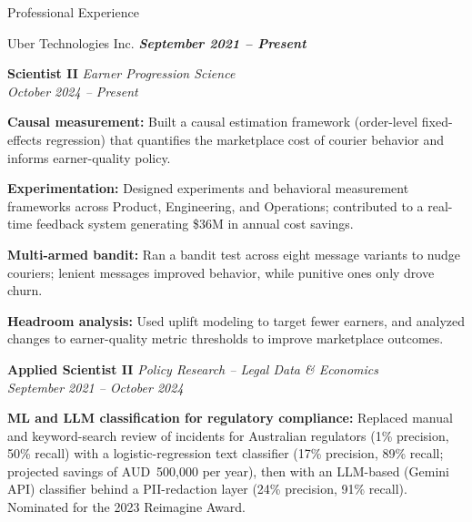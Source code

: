 \documentclass{resume} %
\begin{document}
\begin{rSection}{Professional Experience}


\begin{rSubsection}
    {Uber Technologies Inc.}
    {\textbf{\emph{September 2021 -- Present}}}
    {}
    {}

    \item[] \textbf{Scientist II}
    \hfill
    \textit{Earner Progression Science}
    \\
    \textit{October 2024 -- Present}

    \item \textbf{Causal measurement:} Built a causal estimation framework
    (order-level fixed-effects regression) that quantifies the marketplace
    cost of courier behavior and informs earner-quality policy.

    \item \textbf{Experimentation:} Designed experiments and behavioral
    measurement frameworks across Product, Engineering, and Operations;
    contributed to a real-time feedback system generating \$36M in annual
    cost savings.

    \item \textbf{Multi-armed bandit:} Ran a bandit test across eight message
    variants to nudge couriers; lenient messages improved behavior, while
    punitive ones only drove churn.

    \item \textbf{Headroom analysis:} Used uplift modeling to target fewer
    earners, and analyzed changes to earner-quality metric thresholds to
    improve marketplace outcomes.

    \item[] \textbf{Applied Scientist II}
    \hfill
    \textit{Policy Research -- Legal Data \& Economics}
    \\
    \textit{September 2021 -- October 2024}

    \item \textbf{ML and LLM classification for regulatory compliance:}
    Replaced manual and keyword-search review of incidents for Australian
    regulators (1\% precision, 50\% recall) with a logistic-regression text
    classifier (17\% precision, 89\% recall; projected savings of AUD~500,000
    per year), then with an LLM-based (Gemini API) classifier behind a
    PII-redaction layer (24\% precision, 91\% recall). Nominated for the 2023
    Reimagine Award.


\end{rSubsection}
\end{rSection}
\end{document}
